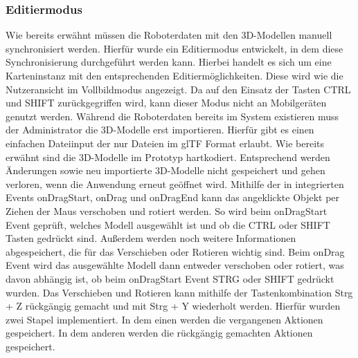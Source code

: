 \subsubsection{Editiermodus}
Wie bereits erwähnt müssen die Roboterdaten mit den 3D-Modellen manuell synchronisiert werden. Hierfür wurde ein Editiermodus entwickelt, in dem diese Synchronisierung durchgeführt werden kann. Hierbei handelt es sich um eine \deckgl{} Karteninstanz mit den entsprechenden Editiermöglichkeiten. Diese wird wie die Nutzeransicht im Vollbildmodus angezeigt. Da auf den Einsatz der Tasten CTRL und SHIFT zurückgegriffen wird, kann dieser Modus nicht an Mobilgeräten genutzt werden.
Während die Roboterdaten bereits im System existieren muss der Administrator die 3D-Modelle erst importieren. Hierfür gibt es einen einfachen Dateiinput der nur Dateien im \ac{glTF} Format erlaubt. Wie bereits erwähnt sind die 3D-Modelle im Prototyp hartkodiert. Entsprechend werden Änderungen sowie neu importierte 3D-Modelle nicht gespeichert und gehen verloren, wenn die Anwendung erneut geöffnet wird.
Mithilfe der in \deckgl{} integrierten Events onDragStart, onDrag und onDragEnd kann das angeklickte Objekt per Ziehen der Maus verschoben und rotiert werden. So wird beim onDragStart Event geprüft, welches Modell ausgewählt ist und ob die CTRL oder SHIFT Tasten gedrückt sind. Außerdem werden noch weitere Informationen abgespeichert, die für das Verschieben oder Rotieren wichtig sind. Beim onDrag Event wird das ausgewählte Modell dann entweder verschoben oder rotiert, was davon abhängig ist, ob beim onDragStart Event STRG oder SHIFT gedrückt wurden. Das Verschieben und Rotieren kann mithilfe der Tastenkombination Strg + Z rückgängig gemacht und mit Strg + Y wiederholt werden. Hierfür wurden zwei Stapel implementiert. In dem einen werden die vergangenen Aktionen gespeichert. In dem anderen werden die rückgängig gemachten Aktionen gespeichert.

